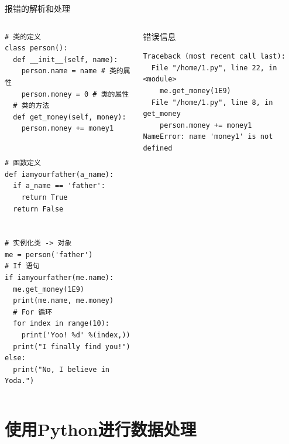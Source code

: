 \documentclass{beamer}
\begin{document}
    \begin{frame}[fragile]{报错的解析和处理}
      \begin{columns}
        \begin{column}{0.48\textwidth}
          \begin{exampleblock}{}
            \begin{lstlisting}
# 类的定义
class person():
  def __init__(self, name):
    person.name = name # 类的属性
    person.money = 0 # 类的属性
  # 类的方法
  def get_money(self, money):
    person.money += money1


# 函数定义
def iamyourfather(a_name):
  if a_name == 'father':
    return True
  return False 


# 实例化类 -> 对象
me = person('father')
# If 语句
if iamyourfather(me.name):
  me.get_money(1E9)
  print(me.name, me.money)
  # For 循环
  for index in range(10):
    print('Yoo! %d' %(index,))
  print("I finally find you!")
else:
  print("No, I believe in Yoda.")
            \end{lstlisting}
          \end{exampleblock}
        \end{column}
        \begin{column}{0.48\textwidth}
          \begin{alertblock}{错误信息}
            \begin{lstlisting}
Traceback (most recent call last):
  File "/home/1.py", line 22, in <module>
    me.get_money(1E9)
  File "/home/1.py", line 8, in get_money
    person.money += money1
NameError: name 'money1' is not defined
            \end{lstlisting}
          \end{alertblock}
        \end{column}
      \end{columns}
    \end{frame}
  
  \section{使用Python进行数据处理}
\end{document}
